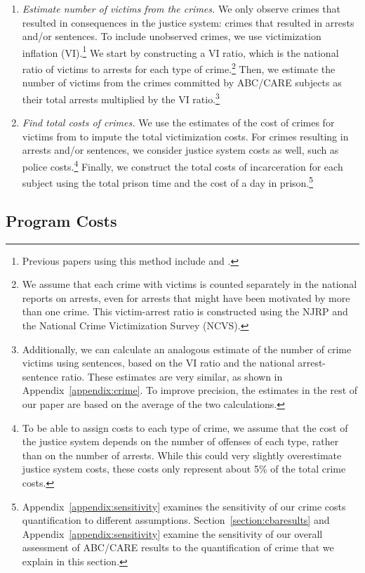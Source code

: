 \begin{enumerate}
\item \textit{Estimate number of victims from the crimes.} We only observe crimes that resulted in consequences in the justice system: crimes that resulted in arrests and/or sentences. To include unobserved crimes, we use victimization inflation (VI).\footnote{Previous papers using this method include \citet{Belfield_Nores_etal_2006_JHR} and \cite{Heckman_Moon_etal_2010_RateofReturn}.} We start by constructing a VI ratio, which is the national ratio of victims to arrests for each type of crime.\footnote{We assume that each crime with victims is counted separately in the national reports on arrests, even for arrests that might have been motivated by more than one crime. This victim-arrest ratio is constructed using the NJRP and the National Crime Victimization Survey (NCVS).} Then, we estimate the number of victims from the crimes committed by ABC/CARE subjects as their total arrests multiplied by the VI ratio.\footnote{Additionally, we can calculate an analogous estimate of the number of crime victims using sentences, based on the VI ratio and the national arrest-sentence ratio. These estimates are very similar, as shown in Appendix~\ref{appendix:crime}. To improve precision, the estimates in the rest of our paper are based on the average of the two calculations.}

\item \textit{Find total costs of crimes.} We use the estimates of the cost of crimes for victims from \cite{McCollister_etal_2010_DAD} to impute the total victimization costs. For crimes resulting in arrests and/or sentences, we consider justice system costs as well, such as police costs.\footnote{To be able to assign costs to each type of crime, we assume that the cost of the justice system depends on the number of offenses of each type, rather than on the number of arrests. While this could very slightly overestimate justice system costs, these costs only represent about 5\% of the total crime costs.} Finally, we construct the total costs of incarceration for each subject using the total prison time and the cost of a day in prison.\footnote{ Appendix~\ref{appendix:sensitivity} examines the sensitivity of our crime costs quantification to different assumptions. Section~\ref{section:cbaresults} and  Appendix~\ref{appendix:sensitivity} examine the sensitivity of our overall assessment of ABC/CARE results to the quantification of crime that we explain in this section.}
\end{enumerate}

\subsection{Program Costs} \label{section:programscosts}

